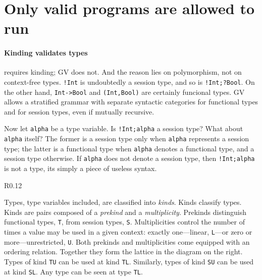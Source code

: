 \section{Only valid programs are allowed to run}
\label{sec:valid}

\paragraph{Kinding validates types}

\freest{} requires kinding; GV does not. And the reason lies on
polymorphism, not on context-free types.
%
\lstinline|!Int| is undoubtedly a session type, and so is
\lstinline|!Int;?Bool|. On the other hand, \lstinline|Int->Bool| and
\lstinline|(Int,Bool)| are certainly funcional types. GV allows a
stratified grammar with separate syntactic categories for functional
types and for session types, even if mutually recursive.

Now let \lstinline|alpha| be a type variable. Is
\lstinline|!Int;alpha| a session type? What about \lstinline|alpha|
itself? The former is a session type only when \lstinline|alpha|
represents a session type; the latter is a functional type when
\lstinline|alpha| denotes a functional type, and a session type
otherwise. If \lstinline|alpha| does not denote a session type, then
\lstinline|!Int;alpha| is not a type, its simply a piece of useless
syntax.

\begin{wrapfigure}{R}{0.12\textwidth}
\end{wrapfigure}
%
Types, type variables included, are classified into \emph{kinds}. 
%
Kinds classify types. Kinds are pairs composed of a \emph{prekind} and
a \emph{multiplicity}. Prekinds distinguish functional types,
\lstinline|T|, from session types, \lstinline|S|.
%
Multiplicities control the number of times a value may be used in a
given context: exactly one---linear, \lstinline|L|---or zero or
more---unrestricted, \lstinline|U|. Both prekinds and multiplicities
come equipped with an ordering relation. Together they form the
lattice in the diagram on the right.
%
Types of kind \lstinline|TU| can be used at kind
\lstinline|TL|. Similarly, types of kind \lstinline|SU| can be used
at kind \lstinline|SL|. Any type can be seen at type \lstinline|TL|.

